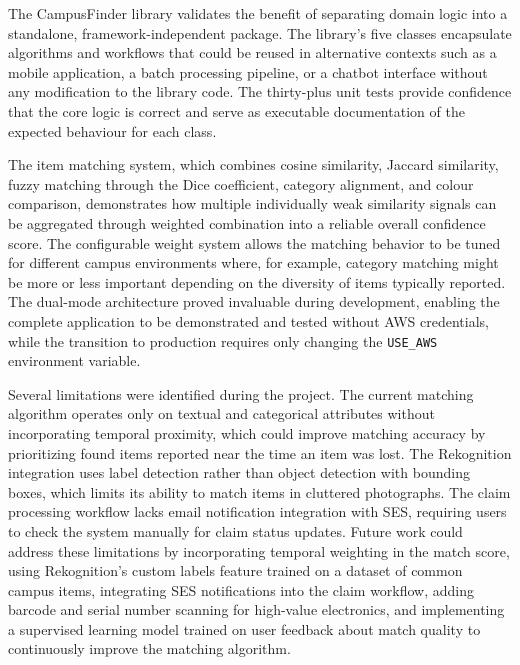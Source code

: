 \documentclass[conference]{IEEEtran}
\begin{document}
The CampusFinder library validates the benefit of separating domain logic into a standalone, framework-independent package. The library's five classes encapsulate algorithms and workflows that could be reused in alternative contexts such as a mobile application, a batch processing pipeline, or a chatbot interface without any modification to the library code. The thirty-plus unit tests provide confidence that the core logic is correct and serve as executable documentation of the expected behaviour for each class.

The item matching system, which combines cosine similarity, Jaccard similarity, fuzzy matching through the Dice coefficient, category alignment, and colour comparison, demonstrates how multiple individually weak similarity signals can be aggregated through weighted combination into a reliable overall confidence score. The configurable weight system allows the matching behavior to be tuned for different campus environments where, for example, category matching might be more or less important depending on the diversity of items typically reported. The dual-mode architecture proved invaluable during development, enabling the complete application to be demonstrated and tested without AWS credentials, while the transition to production requires only changing the \texttt{USE\_AWS} environment variable.

Several limitations were identified during the project. The current matching algorithm operates only on textual and categorical attributes without incorporating temporal proximity, which could improve matching accuracy by prioritizing found items reported near the time an item was lost. The Rekognition integration uses label detection rather than object detection with bounding boxes, which limits its ability to match items in cluttered photographs. The claim processing workflow lacks email notification integration with SES, requiring users to check the system manually for claim status updates. Future work could address these limitations by incorporating temporal weighting in the match score, using Rekognition's custom labels feature trained on a dataset of common campus items, integrating SES notifications into the claim workflow, adding barcode and serial number scanning for high-value electronics, and implementing a supervised learning model trained on user feedback about match quality to continuously improve the matching algorithm.
\end{document}
